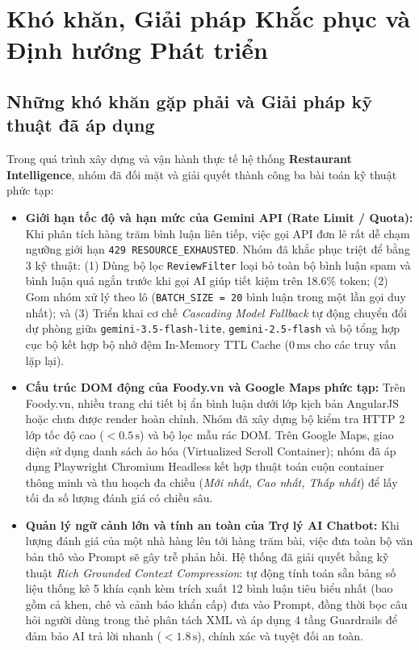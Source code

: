 \documentclass[12pt, a4paper]{article}
\begin{document}
\newpage
\section{Khó khăn, Giải pháp Khắc phục và Định hướng Phát triển}

\subsection{Những khó khăn gặp phải và Giải pháp kỹ thuật đã áp dụng}
Trong quá trình xây dựng và vận hành thực tế hệ thống \textbf{Restaurant Intelligence}, nhóm đã đối mặt và giải quyết thành công ba bài toán kỹ thuật phức tạp:

\begin{itemize}[leftmargin=1.2cm]
    \item \textbf{Giới hạn tốc độ và hạn mức của Gemini API (Rate Limit / Quota):} 
    Khi phân tích hàng trăm bình luận liên tiếp, việc gọi API đơn lẻ rất dễ chạm ngưỡng giới hạn \texttt{429 RESOURCE\_EXHAUSTED}. Nhóm đã khắc phục triệt để bằng 3 kỹ thuật: 
    (1) Dùng bộ lọc \texttt{ReviewFilter} loại bỏ toàn bộ bình luận spam và bình luận quá ngắn trước khi gọi AI giúp tiết kiệm trên 18.6\% token; 
    (2) Gom nhóm xử lý theo lô (\texttt{BATCH\_SIZE = 20} bình luận trong một lần gọi duy nhất); và 
    (3) Triển khai cơ chế \textit{Cascading Model Fallback} tự động chuyển đổi dự phòng giữa \texttt{gemini-3.5-flash-lite}, \texttt{gemini-2.5-flash} và bộ tổng hợp cục bộ kết hợp bộ nhớ đệm In-Memory TTL Cache ($0\,\mathrm{ms}$ cho các truy vấn lặp lại).
    
    \item \textbf{Cấu trúc DOM động của Foody.vn và Google Maps phức tạp:} 
    Trên Foody.vn, nhiều trang chi tiết bị ẩn bình luận dưới lớp kịch bản AngularJS hoặc chưa được render hoàn chỉnh. Nhóm đã xây dựng bộ kiểm tra HTTP 2 lớp tốc độ cao ($<0.5\,\mathrm{s}$) và bộ lọc mẫu rác DOM. Trên Google Maps, giao diện sử dụng danh sách ảo hóa (Virtualized Scroll Container); nhóm đã áp dụng Playwright Chromium Headless kết hợp thuật toán cuộn container thông minh và thu hoạch đa chiều (\textit{Mới nhất, Cao nhất, Thấp nhất}) để lấy tối đa số lượng đánh giá có chiều sâu.
    
    \item \textbf{Quản lý ngữ cảnh lớn và tính an toàn của Trợ lý AI Chatbot:} 
    Khi lượng đánh giá của một nhà hàng lên tới hàng trăm bài, việc đưa toàn bộ văn bản thô vào Prompt sẽ gây trễ phản hồi. Hệ thống đã giải quyết bằng kỹ thuật \textit{Rich Grounded Context Compression}: tự động tính toán sẵn bảng số liệu thống kê 5 khía cạnh kèm trích xuất 12 bình luận tiêu biểu nhất (bao gồm cả khen, chê và cảnh báo khẩn cấp) đưa vào Prompt, đồng thời bọc câu hỏi người dùng trong thẻ phân tách XML và áp dụng 4 tầng Guardrails để đảm bảo AI trả lời nhanh ($< 1.8\,\mathrm{s}$), chính xác và tuyệt đối an toàn.
\end{itemize}
\end{document}
